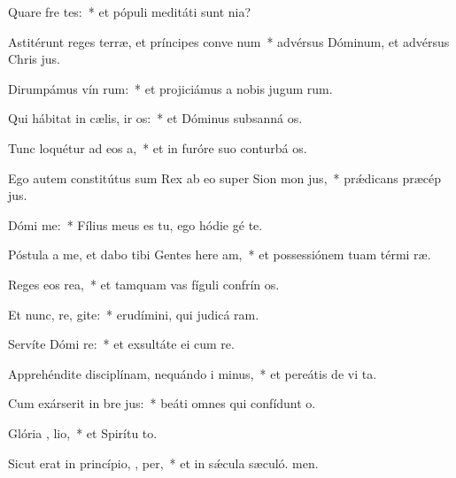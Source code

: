 \item Quare fre tes:~* et pópuli meditáti sunt nia?
\item Astitérunt reges terræ, et príncipes conve  num~* advérsus Dóminum, et advérsus Chris jus.
\item Dirumpámus vín rum:~* et projiciámus a nobis jugum rum.
\item Qui hábitat in cælis, ir os:~* et Dóminus subsanná os.
\item Tunc loquétur ad eos   a,~* et in furóre suo conturbá os.
\item Ego autem constitútus sum Rex ab eo super Sion mon  jus,~* prǽdicans præcép jus.
\item Dómi   me:~* Fílius meus es tu, ego hódie gé te.
\item Póstula a me, et dabo tibi Gentes here am,~* et possessiónem tuam térmi ræ.
\item Reges eos   rea,~* et tamquam vas fíguli confrín os.
\item Et nunc, re, gite:~* erudímini, qui judicá ram.
\item Servíte Dómi  re:~* et exsultáte ei cum re.
\item Apprehéndite disciplínam, nequándo i minus,~* et pereátis de vi ta.
\item Cum exárserit in bre  jus:~* beáti omnes qui confídunt  o.
\item Glória ,  lio,~* et Spirítu to.
\item Sicut erat in princípio,  ,  per,~* et in sǽcula sæculó. men.
